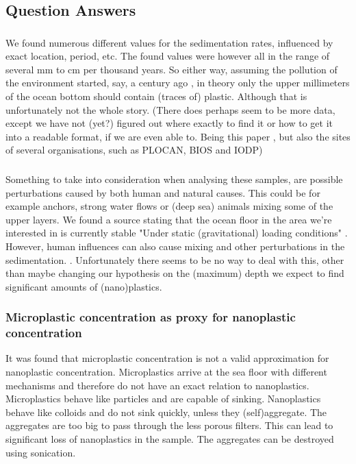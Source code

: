 \documentclass[twocolumn,a4paper,aps,amsmath,amssymb,floatfix,superscriptaddress]{revtex4-2}
\begin{document}
	\subsection{Question Answers}
	\subsubsection{}
	We found numerous different values for the sedimentation rates, influenced by exact location, period, etc. The found values were however all in the range of several mm \cite{Sediment distribution in the Atlantic} to cm \cite{Geomorphical investigaions NW Africa} per thousand years. So either way, assuming the pollution of the environment started, say, a century ago \cite{History of Plastic}, in theory only the upper millimeters of the ocean bottom should contain (traces of) plastic. Although that is unfortunately not the whole story.
	(There does perhaps seem to be more data, except we have not (yet?) figured out where exactly to find it or how to get it into a readable format, if we are even able to. Being this paper \cite{Atlantic sediment cores last 40k years}, but also the sites of several organisations, such as PLOCAN, BIOS and IODP)
	\subsubsection{}
	Something to take into consideration when analysing these samples, are possible perturbations caused by both human and natural causes. This could be for example anchors, strong water flows or (deep sea) animals mixing some of the upper layers. We found a source stating that the ocean floor in the area we're interested in is currently stable "Under static (gravitational) loading conditions" \cite{Sediment stability western Canary Islands}. However, human influences can also cause mixing and other perturbations in the sedimentation. \cite{Anthrophogenic influence sedimentation} \cite{Human impacts marine fossil record}. Unfortunately there seems to be no way to deal with this, other than maybe changing our hypothesis on the (maximum) depth we expect to find significant amounts of (nano)plastics.
	
	\subsubsection{Microplastic concentration as proxy for nanoplastic concentration}
	It was found that microplastic concentration is not a valid approximation for nanoplastic concentration. Microplastics arrive at the sea floor with different mechanisms and therefore do not have an exact relation to nanoplastics. \cite{Vertical flux of microplastic} \cite{MP in Atlantic deep waters} Microplastics behave like particles and are capable of sinking. Nanoplastics behave like colloids and do not sink quickly, unless they (self)aggregate. \cite{Aggregation of NP, what we know} The aggregates are too big to pass through the less porous filters. This can lead to significant loss of nanoplastics in the sample. The aggregates can be destroyed using sonication. \cite{Heteroaggregation, disaggregation} 
\end{document}
